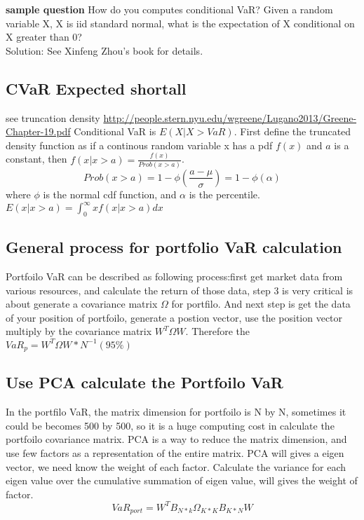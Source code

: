 \documentclass[a4paper,11pt]{article}
\begin{document}
{\bf sample question}
How do you computes conditional VaR? Given a random variable X, X is iid standard normal, what is the expectation of X conditional on X greater than 0?\\
Solution: See Xinfeng Zhou's book for details.\\
\subsection{CVaR Expected shortall}
see truncation density \url{http://people.stern.nyu.edu/wgreene/Lugano2013/Greene-Chapter-19.pdf}
Conditional VaR is $E(X|X>VaR)$. First define the truncated density function as if a continous random variable x has a pdf $f(x)$ and $a$ is a constant, then $f(x|x>a)=\frac{f(x)}{Prob(x>a)}$. \\
$$
Prob(x>a)=1-\phi(\frac{a-\mu}{\sigma})=1-\phi(\alpha)
$$
where $\phi$ is the normal cdf function, and $\alpha$ is the percentile. \\
$E(x|x>a)=\int_0^{\infty} xf(x|x>a) dx$
\subsection{General process for portfolio VaR calculation}
Portfoilo VaR can be described as following process:first get market data from various resources, and calculate the return of those data, step 3 is very critical is about generate a covariance matrix $\Omega$ for portfilo. And next step is get the data of your position of portfoilo, generate a postion vector, use the position vector multiply by the covariance matrix $W^T\Omega W$. Therefore the $VaR_p=W^T\Omega W*N^{-1}(95 \%)$
\subsection{Use PCA calculate the Portfoilo VaR}
In the portfilo VaR, the matrix dimension for portfoilo is N by N, sometimes it could be becomes 500 by 500, so it is a huge computing cost in calculate the portfoilo covariance matrix. PCA is a way to reduce the matrix dimension, and use few factors as a representation of the entire matrix. PCA will gives a eigen vector, we need know the weight of each factor. Calculate the variance for each eigen value over the cumulative summation of eigen value, will gives the weight of factor.
$$ VaR_{port}=W^T B_{N*k}  \Omega_{K*K}  B_{K*N}  W $$\\
\end{document}
